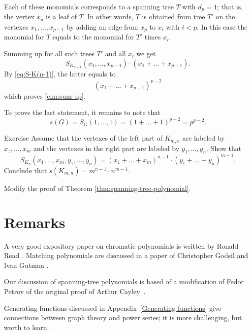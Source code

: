 Each of these monomials corresponds to a spanning tree $T$ with $d_p=1$;
that is, the vertex $x_p$ is a leaf of $T$.
In other words, $T$ is obtained from tree $T'$ on the vertexes $x_1,\dots,x_{p-1}$ 
by adding an edge from $x_p$ to $x_i$ with $i<p$.
In this case the monomial for $T$ equals to the monomial for $T'$ times $x_i$.

Summing up for all such trees $T'$ and all $x_i$ we get 
\[S_{K_{p-1}}(x_1,\dots,x_{p-1})\cdot(x_1+\dots+x_{p-1}).\]
By \ref{eq:S-K(n-1)}, the latter equals to
\[(x_1+\dots+x_{p-1})^{p-2}\]
which proves \ref{clm:sum-up}.

To prove the last statement, it remains to note that 
\[s(G)=S_G(1,\dots,1)=(1+\dots+1)^{p-2}=p^{p-2}.\]
\qedsf

\begin{thm}{Exercise}
Assume that the vertexes of the left part of $K_{m,n}$ are labeled by $x_1,\dots,x_m$ and the vertexes in the right part are labeled by $y_1,\dots,y_n$. 
Show that
\[S_{K_n}(x_1,\dots,x_m,y_1,\dots,y_n)=(x_1+\dots +x_m)^{n-1}\cdot(y_1+\dots +y_n)^{m-1}.\]
Conclude that $s(K_{m,n})=m^{n-1}\cdot n^{m-1}$.

\end{thm}

 Modify the proof of Theorem \ref{thm:spanning-tree-polynomial}.

\section*{Remarks}

A very good expository paper on chromatic polynomials is written by
Ronald Read \cite[see][]{read}. 
Matching polynomials are discussed in a paper of Christopher Godsil and Ivan Gutman \cite[see][]{godsil-gutman}.

Our discussion of spanning-tree polynomials is based of a modification of Fedor Petrov \cite{petrov} of the original proof of Arthur Cayley~\cite{cayley}. 

Generating functions discussed in Appendix~\ref{Generating functions} give connections between graph theory and power series; it is more challenging, but worth to learn.   
